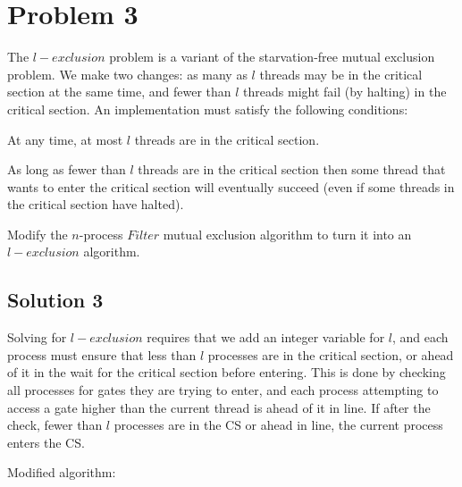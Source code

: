 \documentclass{article}
\begin{document}
\pagebreak
\section{Problem 3}
The $l-exclusion$ problem is a variant of the starvation-free mutual exclusion problem. We make two changes: as many as $l$ threads may be in the critical section at the same time, and fewer than $l$ threads might fail (by halting) in the critical section. An implementation must satisfy the following conditions:

\begin{description}[font=\scshape\bfseries]
\item [$l-Exclusion$:] At any time, at most $l$ threads are in the critical section.
\item [$l-Starvation-Freedom$:] As long as fewer than $l$ threads are in the critical section then some thread that wants to enter the critical section will eventually succeed (even if some threads in the critical section have halted).
\end{description}

Modify the $n$-process $Filter$ mutual exclusion algorithm to turn it into an $l-exclusion$ algorithm.

\subsection{Solution 3}
Solving for $l-exclusion$ requires that we add an integer variable for $l$, and each process must ensure that less than $l$ processes are in the critical section, or ahead of it in the wait for the critical section before entering. This is done by checking all processes for gates they are trying to enter, and each process attempting to access a gate higher than the current thread is ahead of it in line. If after the check, fewer than $l$ processes are in the CS or ahead in line, the current process enters the CS.

Modified algorithm:
\end{document}

